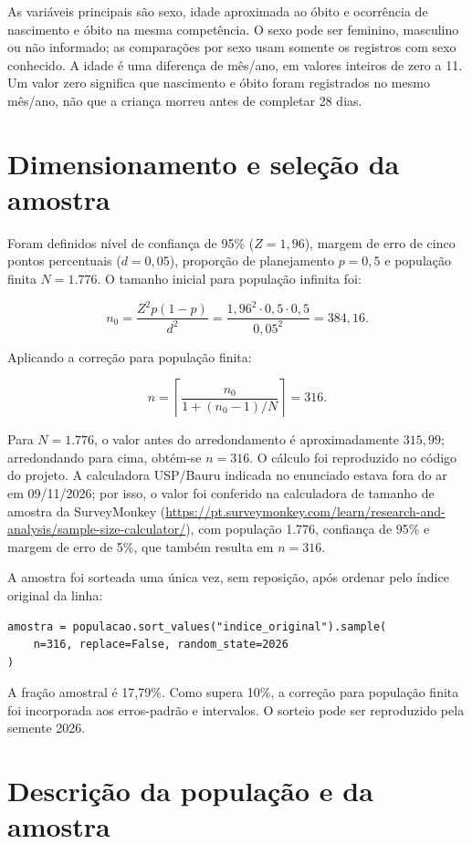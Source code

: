 \documentclass[12pt]{article}
\begin{document}
As variáveis principais são sexo, idade aproximada ao óbito e ocorrência de nascimento e óbito na mesma competência. O sexo pode ser feminino, masculino ou não informado; as comparações por sexo usam somente os registros com sexo conhecido. A idade é uma diferença de mês/ano, em valores inteiros de zero a 11. Um valor zero significa que nascimento e óbito foram registrados no mesmo mês/ano, não que a criança morreu antes de completar 28 dias.

\section{Dimensionamento e seleção da amostra}

Foram definidos nível de confiança de 95\% (\(Z=1{,}96\)), margem de erro de cinco pontos percentuais (\(d=0{,}05\)), proporção de planejamento \(p=0{,}5\) e população finita \(N=1.776\). O tamanho inicial para população infinita foi:

\[
n_0 = \frac{Z^2p(1-p)}{d^2}
= \frac{1{,}96^2 \cdot 0{,}5 \cdot 0{,}5}{0{,}05^2}
= 384{,}16.
\]

Aplicando a correção para população finita:

\[
n = \left\lceil \frac{n_0}{1 + (n_0 - 1)/N} \right\rceil = 316.
\]

Para \(N=1.776\), o valor antes do arredondamento é aproximadamente \(315{,}99\); arredondando para cima, obtém-se \(n=316\). O cálculo foi reproduzido no código do projeto. A calculadora USP/Bauru indicada no enunciado estava fora do ar em 09/11/2026; por isso, o valor foi conferido na calculadora de tamanho de amostra da SurveyMonkey (\url{https://pt.surveymonkey.com/learn/research-and-analysis/sample-size-calculator/}), com população 1.776, confiança de 95\% e margem de erro de 5\%, que também resulta em \(n=316\).

A amostra foi sorteada uma única vez, sem reposição, após ordenar pelo índice original da linha:

\begin{verbatim}
amostra = populacao.sort_values("indice_original").sample(
    n=316, replace=False, random_state=2026
)
\end{verbatim}

A fração amostral é 17,79\%. Como supera 10\%, a correção para população finita foi incorporada aos erros-padrão e intervalos. O sorteio pode ser reproduzido pela semente 2026.

\section{Descrição da população e da amostra}
\end{document}
